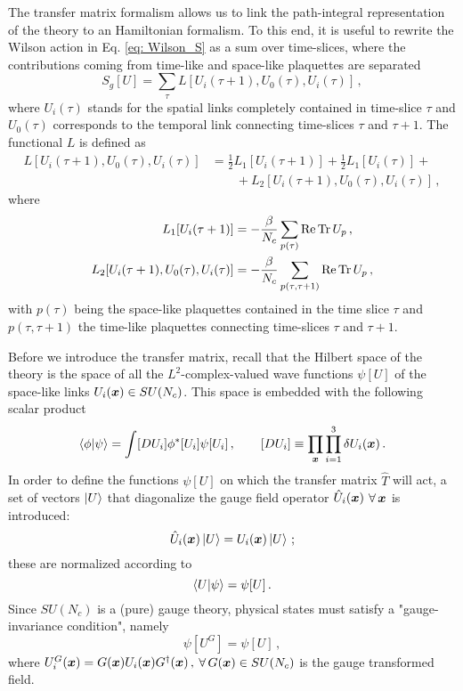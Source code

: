 \documentclass{article}
\begin{document}
The transfer matrix formalism allows us to link the path-integral representation of the theory to an Hamiltonian formalism. To this end, it is useful to rewrite the Wilson action in Eq. \eqref{eq: Wilson_S} as a sum over time-slices, where the contributions coming from time-like and space-like plaquettes are separated \cite{Montvay:1994cy}
\begin{equation}
    S_g[U] = \sum_\tau L[U_i(\tau+1), U_0(\tau), U_i(\tau)] \, ,
\end{equation}
where $U_i(\tau)$ stands for the spatial links completely contained in time-slice $\tau$ and $U_0(\tau)$ corresponds to the temporal link connecting time-slices $\tau$ and $\tau+1$. The functional $L$ is defined as
\begin{equation}
    \begin{aligned}
        L[U_i(\tau+1), U_0(\tau), U_i(\tau)] &= \frac{1}{2} L_1[U_i(\tau+1)] + \frac{1}{2} L_1[U_i(\tau)] + \\
        &\qquad +L_2[U_i(\tau+1), U_0(\tau), U_i(\tau)] \, , 
    \end{aligned}
\end{equation}
where
\begin{align}
    L_1[U_i(\tau+1)] &= -\frac{\beta}{N_c} \sum_{p(\tau)} \Re \Tr U_p \, , \\
    L_2[U_i(\tau+1), U_0(\tau), U_i(\tau)] &= -\frac{\beta}{N_c} \sum_{p(\tau, \tau+1)} \Re \Tr U_p \, ,
\end{align}
with $p(\tau)$ being the space-like plaquettes contained in the time slice $\tau$ and $p(\tau, \tau+1)$ the time-like plaquettes connecting time-slices $\tau$ and $\tau+1$. 

Before we introduce the transfer matrix, recall that the Hilbert space of the theory is the space of all the $L^2$-complex-valued wave functions $\psi[U]$ of the space-like links $U_i(\vb*{x}) \in SU(N_c)$\cite{Della_Morte_2009}. This space is embedded with the following scalar product
\begin{equation}
    \braket{\phi}{\psi} = \int [D U_i] \phi^* [U_i] \psi[U_i] \, , \qquad [D U_i] \equiv \prod_{\vb*{x}} \prod_{i=1}^3 \delta U_i(\vb*{x}) \, .
\end{equation}
In order to define the functions $\psi[U]$ on which the transfer matrix $\hat{T}$ will act, a set of vectors $\ket{U}$ that diagonalize the gauge field operator $\hat{U}_i(\vb*{x})$ $\forall \, \vb*{x}$ is introduced:
\begin{equation}
    \hat{U}_i(\vb*{x}) \ket{U} = U_i(\vb*{x}) \ket{U} \, ;
\end{equation}
these are normalized according to
\begin{equation}
    \braket{U}{\psi} = \psi[U] \, .
\end{equation}
Since $SU(N_c)$ is a (pure) gauge theory, physical states must satisfy a "gauge-invariance condition", namely
\begin{equation}
    \psi[U^G] = \psi[U] \, , 
\end{equation}
where $U_i^G(\vb*{x}) = G(\vb*{x}) U_i(\vb*{x}) G^\dag(\vb*{x})\, ,$ $\forall \, G(\vb*{x}) \in SU(N_c)$ is the gauge transformed field.





\printbibliography
\end{document}
